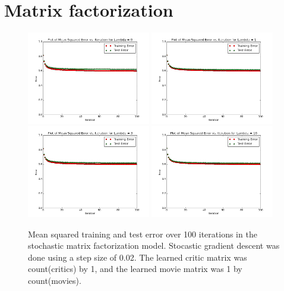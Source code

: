 \documentclass[12pt]{article}
\begin{document}
\section{Matrix factorization}

	\begin{figure}[H]
	\centering
	\includegraphics[width=0.48\textwidth]{plots/test-i100d1l0.png}
	\includegraphics[width=0.48\textwidth]{plots/test-i100d1l1.png}
	\includegraphics[width=0.48\textwidth]{plots/test-i100d1l3.png}
	\includegraphics[width=0.48\textwidth]{plots/test-i100d1l10.png}
	\caption{Mean squared training and test error over 100 iterations in the stochastic matrix factorization model. Stocastic gradient descent was done using a step size of 0.02. The learned critic matrix was count(critics) by 1, and the learned movie matrix was 1 by count(movies).}
	\label{fig:1}
	\end{figure}
\end{document}
